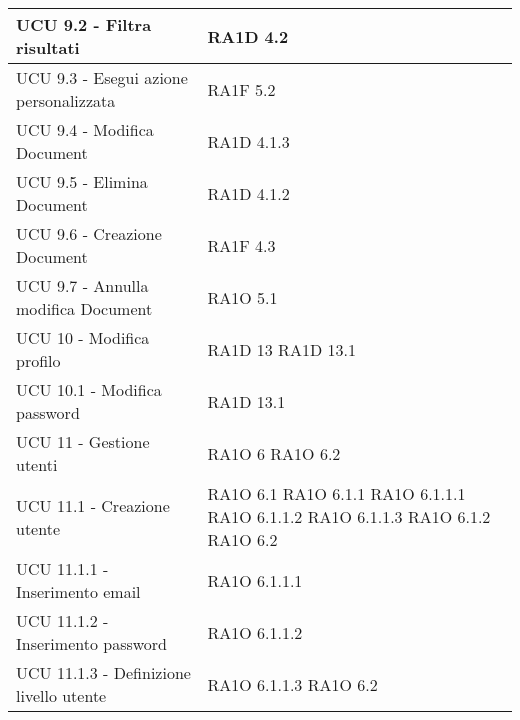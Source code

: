 \begin{center}
\begin{longtable}{ | p{5cm} | p{5cm} |}
            UCU 9.2 - Filtra risultati &  RA1D 4.2 \newline  \\ \hline      
            UCU 9.3 - Esegui azione personalizzata & RA1F 5.2 \newline  \\ \hline      
            UCU 9.4 - Modifica Document &  RA1D 4.1.3 \newline  \\ \hline      
            UCU 9.5 - Elimina Document &  RA1D 4.1.2 \newline  \\ \hline      
            UCU 9.6 - Creazione Document &  RA1F 4.3 \newline  \\ \hline      
            UCU 9.7 - Annulla modifica Document &  RA1O 5.1 \newline  \\ \hline      
            UCU 10 - Modifica profilo &  RA1D 13 \newline  RA1D 13.1 \newline  \\ \hline      
            UCU 10.1 - Modifica password &  RA1D 13.1 \newline  \\ \hline      
            UCU 11 - Gestione utenti &  RA1O 6 \newline  RA1O 6.2 \newline  \\ \hline      
            UCU 11.1 - Creazione utente &  RA1O 6.1 \newline  RA1O 6.1.1 \newline  RA1O 6.1.1.1 \newline  RA1O 6.1.1.2 \newline  RA1O 6.1.1.3 \newline  RA1O 6.1.2 \newline  RA1O 6.2 \newline  \\ \hline      
            UCU 11.1.1 - Inserimento email &  RA1O 6.1.1.1 \newline  \\ \hline      
            UCU 11.1.2 - Inserimento password &  RA1O 6.1.1.2 \newline  \\ \hline      
            UCU 11.1.3 - Definizione livello utente &  RA1O 6.1.1.3 \newline  RA1O 6.2 \newline  \\ \hline      

\end{longtable}
\end{center}
